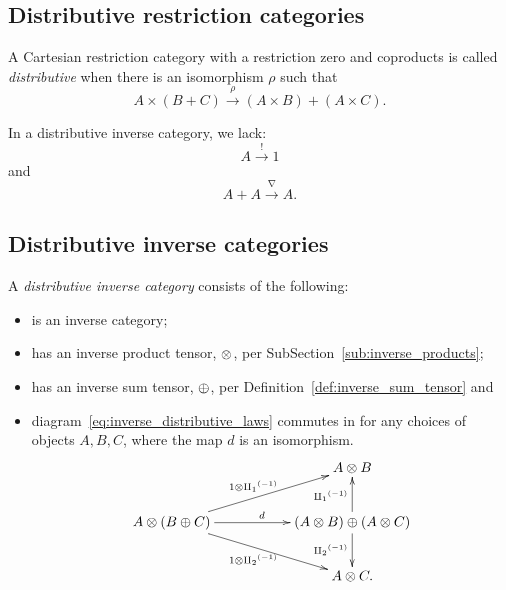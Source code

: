 \subsection{Distributive restriction categories} %
\label{sub:distributive_restriction_categories}


\begin{definition}
  A Cartesian restriction category with a restriction zero and coproducts is called
  \emph{distributive} when there is an isomorphism $\rho$ such that
  \[
    A\times (B+C) \xrightarrow{\rho} (A\times B) +(A\times C).
  \]
\end{definition}

In a distributive inverse category, we lack:
\[
  A  \xrightarrow{!} 1
\]
and
\[
  A+A \xrightarrow{\nabla} A.
\]

\subsection{Distributive inverse categories} %
\label{sub:distributive_inverse_categories}
%
\begin{definition}\label{def:distributive_inverse_category}
  A \emph{distributive inverse category} \D consists of the following:
  \begin{itemize}
    \item \D is an inverse category;
    \item \D has an inverse product tensor, $\otimes$, per SubSection~\ref{sub:inverse_products};
    \item \D has an inverse sum tensor, $\oplus$, per Definition~\ref{def:inverse_sum_tensor} and
    \item diagram~\ref{eq:inverse_distributive_laws} commutes in \D for any choices of objects
      $A, B, C$, where the map $d$ is an isomorphism.
    \begin{equation}
      \xymatrix{
      && A\*B\\
      A \* (B \+ C) \ar[rr]^{d} \ar[urr]^{1\*\icpa} \ar[drr]_{1\*\icpb}
        && (A\*B) \+ (A \* C) \ar[u]^{\icpa} \ar[d]_{\icpb}\\
      && A\*C.
      }\label{eq:inverse_distributive_laws}
    \end{equation}
  \end{itemize}
\end{definition}

